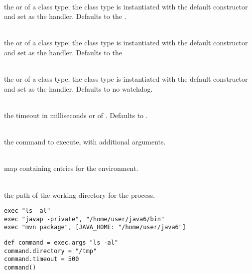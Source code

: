 \begin{asparaitem}
%
\item[\code{handler: handler}] \hfill \\
the \cite{executeresulthandler13} or of a class 
type; the class type is instantiated with the default
constructor and set as the handler. Defaults to the 
\cite{defaultexecuteresulthandler13}.
%
\item[\code{destroyer: destroyer}] \hfill \\
the \cite{processdestroyer13} or of a class 
type; the class type is instantiated with the default
constructor and set as the handler.
Defaults to the \cite{shutdownhookprocessdestroyer13}
%
\item[\code{watchdog: watchdog}] \hfill \\
the \cite{executewatchdog13} or of a class 
type; the class type is instantiated with the default
constructor and set as the handler.
Defaults to no watchdog.
%
\item[\code{timeout: duration}] \hfill \\
the timeout in milliseconds or of \cite{duration13}.
Defaults to .
%
\item[\code{command}] \hfill \\
the command to execute, with additional arguments.
%
\item[\code{env}] \hfill \\
map containing  entries for the environment.
%
\item[\code{path}] \hfill \\
the path of the working directory for the process.
%
\end{asparaitem}

\begin{lstlisting}[style=Groovybash, label={lst:example_exec1}, title={
Examples to execute external commands.}]
exec "ls -al"
exec "javap -private", "/home/user/java6/bin"
exec "mvn package", [JAVA_HOME: "/home/user/java6"]
\end{lstlisting}

\begin{lstlisting}[style=Groovybash, label={lst:example_exec2}, title={
Deleyed execution of external commands.}]
def command = exec.args "ls -al"
command.directory = "/tmp"
command.timeout = 500
command()
\end{lstlisting}

